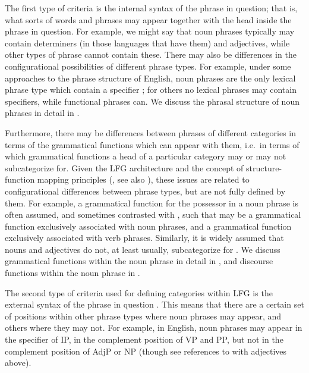 \documentclass[output=paper,hidelinks]{langscibook}
\begin{document}
The first type of criteria is the internal syntax of the phrase in question; that is, what sorts of words and phrases may appear together with the head inside the phrase in question. For example, we might say that noun phrases typically may contain determiners (in those languages that have them) and adjectives, while other types of phrase cannot contain these. There may also be differences in the configurational possibilities of different phrase types. For example, under some approaches to the phrase structure of English, noun phrases are the only lexical phrase type which contain a specifier \citep[e.g.][]{dalrymple01}; for others \citep[e.g.][]{falk2001lexical} no lexical phrases may contain specifiers, while functional phrases can. We discuss the phrasal structure of noun phrases in detail in .

Furthermore, there may be differences between phrases of different categories in terms of the grammatical functions which can appear with them, i.e.\ in terms of which grammatical functions a head of a particular category may or may not subcategorize for. Given the LFG architecture and the concept of structure-function mapping principles (\citealt[105, 117]{BresnanEtAl2016}, see also ), these issues are related to configurational differences between phrase types, but are not fully defined by them. For example, a grammatical function {\POSS} for the possessor in a noun phrase is often assumed, and sometimes contrasted with \SUBJ, such that {\POSS} may be a grammatical function exclusively associated with noun phrases, and {\SUBJ} a grammatical function exclusively associated with verb phrases. Similarly, it is widely assumed that nouns and adjectives do not, at least usually, subcategorize for {\OBJ} \citetext{though see \citealp{MittSadl08}, \citealp{AlShaSadl09}, and \citealp{VincBorj10a} for {\OBJ} with adjectives and \citealp{Lowe17} for further discussion}. We discuss grammatical functions within the noun phrase in detail in , and discourse functions within the noun phrase in . 

The second type of criteria used for defining categories within LFG is the external syntax of the phrase in question \citep[labelled ``distribution'' by][]{Lowe19b}. This means that there are a certain set of positions within other phrase types where noun phrases may appear, and others where they may not. For example, in English, noun phrases may appear in the specifier of IP, in the complement position of VP and PP, but not in the complement position of AdjP or NP (though see references to {\OBJ} with adjectives above).
\end{document}
